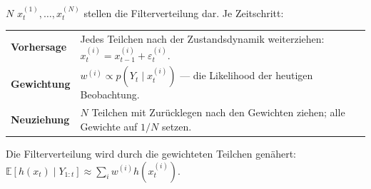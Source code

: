 \begin{definition}
$N$  $x_t^{(1)},\ldots,x_t^{(N)}$ stellen die Filterverteilung dar. Je Zeitschritt:
\begin{center}
{\small
\renewcommand{\arraystretch}{1.5}
\begin{tabular}{@{}P{2.4cm}P{6.4cm}@{}}
\toprule
\textbf{Vorhersage} & Jedes Teilchen nach der Zustandsdynamik weiterziehen: $x_t^{(i)} = x_{t-1}^{(i)} + \varepsilon_t^{(i)}$.\\
\textbf{Gewichtung} & $w^{(i)} \propto p(Y_t\mid x_t^{(i)})$ --- die Likelihood der heutigen Beobachtung.\\
\textbf{Neuziehung} & $N$ Teilchen mit Zurücklegen nach den Gewichten ziehen; alle Gewichte auf $1/N$ setzen.\\
\bottomrule
\end{tabular}}
\end{center}
Die Filterverteilung wird durch die gewichteten Teilchen genähert: $\mathbb E[h(x_t)\mid Y_{1:t}] \approx \sum_i w^{(i)}h(x_t^{(i)})$.
\end{definition}

